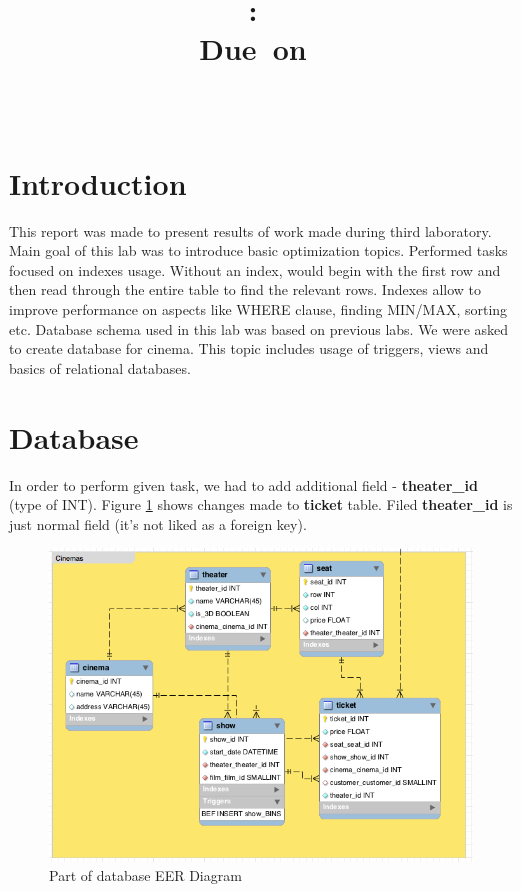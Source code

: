 \documentclass{article}
\title{
\vspace{2in}
\textmd{\textbf{\hmwkClass:\ \hmwkTitle}}\\
\normalsize\vspace{0.1in}\small{Due\ on\ \hmwkDueDate}\\
\vspace{0.1in}\large{\textit{\hmwkClassInstructor\ \hmwkClassTime}}
\vspace{3in}
}
\author{\textbf{\hmwkAuthorName}}
\date{} %
\begin{document}
\maketitle



\newpage
\tableofcontents
\newpage


\section{Introduction}
This report was made to present results of work made during third laboratory.
Main goal of this lab was to introduce basic optimization topics.
Performed tasks focused on indexes usage.
Without an index, would begin with the first row and then read through the entire table to find the relevant rows. 
Indexes allow to improve performance on aspects like WHERE clause, finding MIN/MAX, sorting etc.
\newline\newline
Database schema used in this lab was based on previous labs.
We were asked to create database for cinema. This topic includes usage of triggers, views and basics of relational databases.

\section{Database}
In order to perform given task, we had to add additional field - \textbf{theater\_id} (type of INT).
Figure \ref{fig:database} shows changes made to \textbf{ticket} table. Filed \textbf{theater\_id} is just normal field (it's not liked as a foreign key).

\begin{figure}[ht!]
\centering
\includegraphics[width=0.75\columnwidth]{database} 
\caption{Part of database EER Diagram}
\label{fig:database}
\end{figure}
\end{document}
